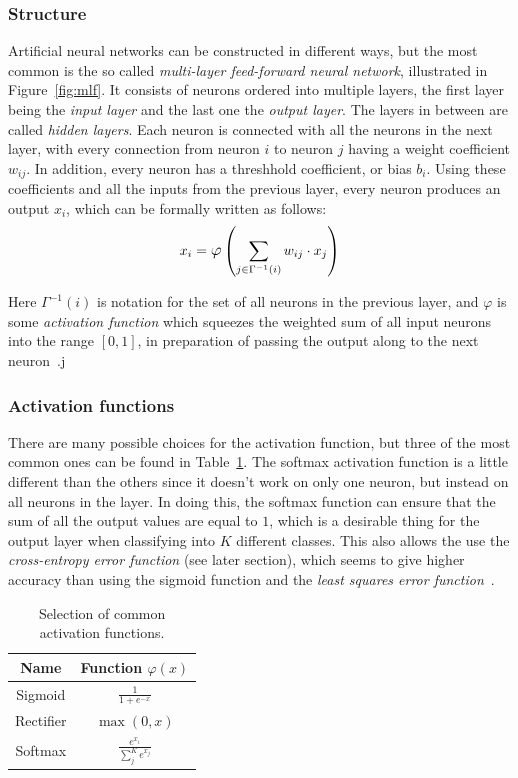 \documentclass{kththesis}
\renewcommand{\arraystretch}{1.2}
\begin{document}
\subsubsection{Structure}
Artificial neural networks can be constructed in different ways, but the most common is the so called \textit{multi-layer feed-forward neural network}, illustrated in Figure~\ref{fig:mlf}. It consists of neurons ordered into multiple layers, the first layer being the \textit{input layer} and the last one the \textit{output layer}. The layers in between are called \textit{hidden layers}. Each neuron is connected with all the neurons in the next layer, with every connection from neuron $i$ to neuron $j$ having a weight coefficient $w_{ij}$. In addition, every neuron has a threshhold coefficient, or bias $b_i$. Using these coefficients and all the inputs from the previous layer, every neuron produces an output $x_i$, which can be formally written as follows:
\[x_i = \mathlarger{\varphi}\left(\sum_{j \in \Gamma^{-1}(i)}{w_{ij} \cdot x_j}\right)\]

Here $\Gamma^{-1}(i)$ is notation for the set of all neurons in the previous layer, and $\varphi$ is some \textit{activation function} which squeezes the weighted sum of all input neurons into the range $[0, 1]$, in preparation of passing the output along to the next neuron~\cite{mlfIntro}.j

\subsubsection{Activation functions}
There are many possible choices for the activation function, but three of the most common ones can be found in Table~\ref{tab:activation_functions}. The softmax activation function is a little different than the others since it doesn't work on only one neuron, but instead on all neurons in the layer. In doing this, the softmax function can ensure that the sum of all the output values are equal to $1$, which is a desirable thing for the output layer when classifying into $K$ different classes. This also allows the use the \textit{cross-entropy error function} (see later section), which seems to give higher accuracy than using the sigmoid function and the \textit{least squares error function}~\cite{dunne1997pairing}.

\begin{table}[h]
  \renewcommand{\arraystretch}{1.2}
  \begin{center}
    \caption{Selection of common activation functions.}
    \label{tab:activation_functions}
    \begin{tabular}{cc}
      \textbf{Name} & \textbf{Function} $\varphi(x)$\\
      \toprule
      Sigmoid & $\displaystyle \frac{1}{1 + e^{-x}} $ \\[4mm]
      Rectifier & $\displaystyle \max(0, x)$ \\[3mm]
      Softmax & $\displaystyle \frac{e^{x_i}}{\sum_j^K{e^{x_j}}}$ \\
    \end{tabular}
  \end{center}
\end{table}
\end{document}
